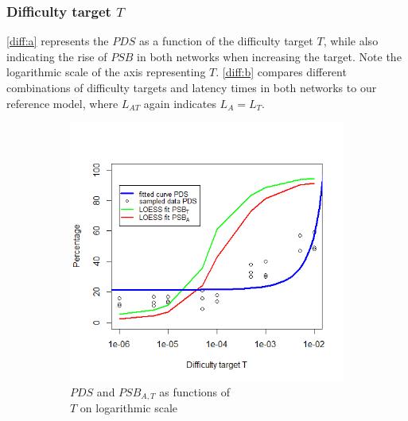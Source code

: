 \documentclass[a4paper,12pt,twoside]{report}
\begin{document}
\subsubsection{Difficulty target $T$}
\autoref{diff:a} represents the $PDS$ as a function of the difficulty target $T$, while also indicating the rise of $PSB$ in both networks when increasing the target. Note the logarithmic scale of the axis representing $T$. \autoref{diff:b} compares different combinations of difficulty targets and latency times in both networks to our reference model, where $L_{AT}$ again indicates $L_{A} = L_{T}$.\begin{figure}[hb!]
\centering
\begin{subfigure}{.5\textwidth}
  \centering
  \includegraphics[width=\linewidth]{Experiments/Difficulty/difficultyfit.png}
  \caption{$PDS$ and $PSB_{A,T}$ as functions of \\ $T$ on logarithmic scale}
  \label{diff:a}
\end{subfigure}%
\begin{subfigure}{.5\textwidth}
  \centering

\end{subfigure}
\end{figure}
\end{document}
